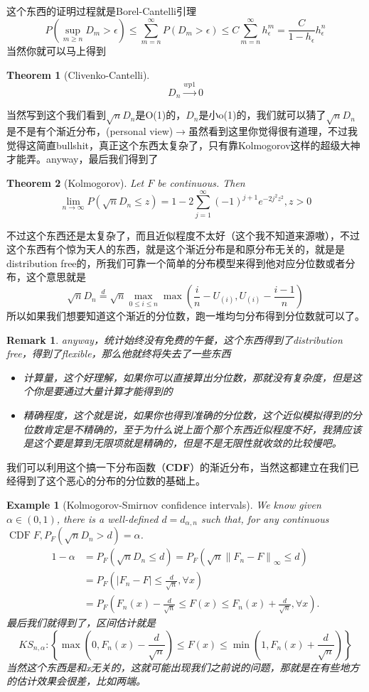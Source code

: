 \documentclass{article}
\newtheorem{theorem}{Theorem}[section]
\newtheorem{example}{Example}[section]
\newtheorem{remark}{Remark}[theorem]
\begin{document}
这个东西的证明过程就是Borel-Cantelli引理
$$
P\left(\sup _{m \geq n} D_m>\epsilon\right) \leq \sum_{m=n}^{\infty} P\left(D_m>\epsilon\right) \leq C \sum_{m=n}^{\infty} h_\epsilon^m=\frac{C}{1-h_\epsilon} h_\epsilon^n
$$
当然你就可以马上得到
\begin{theorem}[Clivenko-Cantelli]
	$$D_n\stackrel{wp1}{\rightarrow}0$$
\end{theorem}
当然写到这个我们看到$\sqrt{n}D_n$是O(1)的，$D_n$是小o(1)的，我们就可以猜了$\sqrt{n}D_n$是不是有个渐近分布，(personal view)$\to$虽然看到这里你觉得很有道理，不过我觉得这简直bullshit，真正这个东西太复杂了，只有靠Kolmogorov这样的超级大神才能弄。anyway，最后我们得到了
\begin{theorem}[Kolmogorov]
	Let $F$ be continuous. Then
	$$
	\lim _{n \rightarrow \infty} P\left(\sqrt{n} D_n \leq z\right)=1-2 \sum_{j=1}^{\infty}(-1)^{j+1} e^{-2 j^2 z^2}, z>0
	$$
\end{theorem}
不过这个东西还是太复杂了，而且近似程度不太好（这个我不知道来源嗷），不过这个东西有个惊为天人的东西，就是这个渐近分布是和原分布无关的，就是是distribution free的，所我们可靠一个简单的分布模型来得到他对应分位数或者分布，这个意思就是
$$
\sqrt{n} D_n \stackrel{d}{=} \sqrt{n} \max _{0 \leq i \leq n} \max \left(\frac{i}{n}-U_{(i)}, U_{(i)}-\frac{i-1}{n}\right)
$$
所以如果我们想要知道这个渐近的分位数，跑一堆均匀分布得到分位数就可以了。
\begin{remark}
	anyway，统计始终没有免费的午餐，这个东西得到了distribution free，得到了flexible，那么他就终将失去了一些东西
	\begin{itemize}
		\item 计算量，这个好理解，如果你可以直接算出分位数，那就没有复杂度，但是这个你是要通过大量计算才能得到的
		\item 精确程度，这个就是说，如果你也得到准确的分位数，这个近似模拟得到的分位数肯定是不精确的，至于为什么说上面个那个东西近似程度不好，我猜应该是这个要是算到无限项就是精确的，但是不是无限性就收敛的比较慢吧。
	\end{itemize}
\end{remark}
我们可以利用这个搞一下分布函数（\textbf{CDF}）的渐近分布，当然这都建立在我们已经得到了这个恶心的分布的分位数的基础上。
\begin{example}[Kolmogorov-Smirnov confidence intervals]
	We know given $\alpha \in(0,1)$, there is a well-defined $d=d_{\alpha, n}$ such that, for any continuous $\operatorname{CDF} F, P_F\left(\sqrt{n} D_n>d\right)=\alpha$.
	$$
	\begin{aligned}
		1-\alpha & =P_F\left(\sqrt{n} D_n \leq d\right)=P_F\left(\sqrt{n}\left\|F_n-F\right\|_{\infty} \leq d\right) \\
		& =P_F\left(\left|F_n-F\right| \leq \frac{d}{\sqrt{n}}, \forall x\right) \\
		& =P_F\left(F_n(x)-\frac{d}{\sqrt{n}} \leq F(x) \leq F_n(x)+\frac{d}{\sqrt{n}}, \forall x\right) .
	\end{aligned}
	$$
	最后我们就得到了，区间估计就是
	$$
	K S_{n, \alpha}:\left\{\max \left(0, F_n(x)-\frac{d}{\sqrt{n}}\right) \leq F(x) \leq \min \left(1, F_n(x)+\frac{d}{\sqrt{n}}\right)\right\}
	$$
	当然这个东西是和x无关的，这就可能出现我们之前说的问题，那就是在有些地方的估计效果会很差，比如两端。
\end{example}
\end{document}

